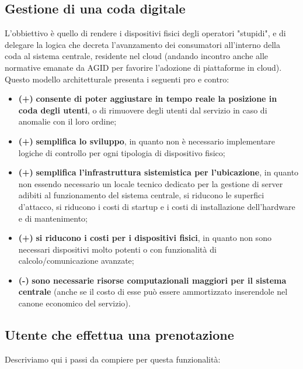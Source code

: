 \documentclass[a4paper, titlepage, 12pt, openright, oneside]{book}
\begin{document}
\subsection{Gestione di una coda digitale}
L'obbiettivo è quello di rendere i dispositivi fisici degli operatori "stupidi", e di delegare la logica che decreta l'avanzamento dei consumatori all'interno della coda al sistema centrale, residente nel cloud (andando incontro anche alle normative emanate da AGID per favorire l'adozione di piattaforme in cloud).
Questo modello architetturale presenta i seguenti pro e contro:
\begin{itemize}
	\item \textbf{(+)} \textbf{consente di poter aggiustare in tempo reale la posizione in coda degli utenti}, o di rimuovere degli utenti dal servizio in caso di anomalie con il loro 						ordine;
	\item \textbf{(+)} \textbf{semplifica lo sviluppo}, in quanto non è necessario implementare logiche di controllo per ogni tipologia di dispositivo fisico;
	\item \textbf{(+)} \textbf{semplifica l'infrastruttura sistemistica per l'ubicazione}, in quanto non essendo necessario un locale tecnico dedicato per la gestione di server adibiti al funzionamento del sistema centrale, si riducono le superfici d'attacco, si riducono i costi di startup e i costi di installazione dell'hardware e di mantenimento;
	\item \textbf{(+)} \textbf{si riducono i costi per i dispositivi fisici}, in quanto non sono necessari dispositivi molto potenti o con funzionalità di calcolo/comunicazione avanzate;
	\item \textbf{(-)} \textbf{sono necessarie risorse computazionali maggiori per il sistema centrale} (anche se il costo di esse può essere ammortizzato inserendole nel canone economico del servizio).
\end{itemize}

\subsection{Utente che effettua una prenotazione}

Descriviamo qui i passi da compiere per questa funzionalità:
\end{document}
